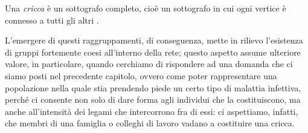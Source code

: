 \begin{definizione} 
Una \emph{cricca} è un sottografo completo, cioè un sottografo in cui ogni vertice è connesso a tutti gli altri \cite{Bickle}.
\end{definizione}
%
L'emergere di questi raggruppamenti, di conseguenza, mette in rilievo l'esistenza di gruppi fortemente coesi all'interno della rete; questo aspetto assume ulteriore valore, in particolare, quando cerchiamo di rispondere ad una domanda che ci siamo posti nel precedente capitolo, ovvero come poter rappresentare una popolazione nella quale stia prendendo piede un certo tipo di malattia infettiva, perché ci consente non solo di dare forma agli individui che la costituiscono, ma anche all'intensità dei legami che intercorrono fra di essi: ci aspettiamo, infatti, che membri di una famiglia o colleghi di lavoro vadano a costituire una cricca. 

